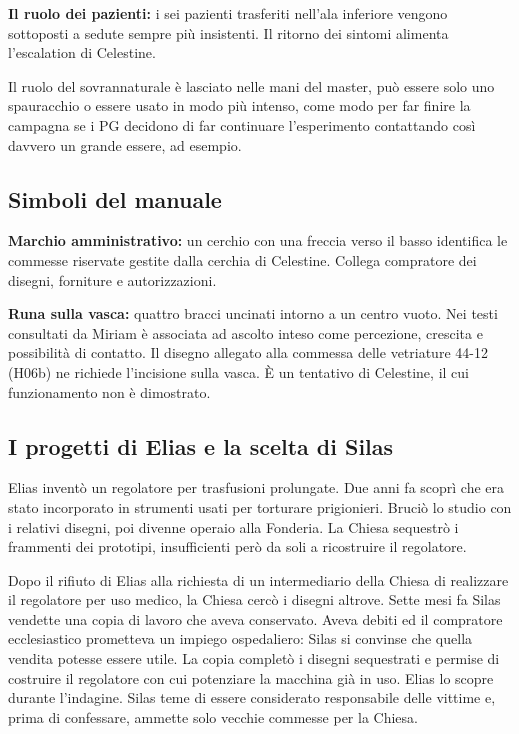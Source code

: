 \documentclass[11pt,a4paper]{article}
\begin{document}
\textbf{Il ruolo dei pazienti:} i sei pazienti  trasferiti nell'ala inferiore vengono sottoposti a sedute sempre più insistenti. Il ritorno dei sintomi alimenta l'escalation di Celestine.

\begin{gmbox}
Il ruolo del sovrannaturale è lasciato nelle mani del master, può essere solo uno spauracchio o essere usato in modo più intenso, come modo per far finire la campagna se i PG decidono di far continuare l'esperimento contattando così davvero un grande essere, ad esempio. 
\end{gmbox}

\subsection{Simboli del manuale}
\textbf{Marchio amministrativo:} un cerchio con una freccia verso il basso identifica le commesse riservate gestite dalla cerchia di Celestine. Collega compratore dei disegni, forniture e autorizzazioni.

\textbf{Runa sulla vasca:} quattro bracci uncinati intorno a un centro vuoto. Nei testi consultati da Miriam è associata ad ascolto inteso come percezione, crescita e possibilità di contatto. Il disegno allegato alla commessa delle vetriature 44-12 (H06b) ne richiede l'incisione sulla vasca. È un tentativo di Celestine, il cui funzionamento non è dimostrato.


\subsection{I progetti di Elias e la scelta di Silas}
Elias inventò un regolatore per trasfusioni prolungate. Due anni fa scoprì che era stato incorporato in strumenti usati per torturare prigionieri. Bruciò lo studio con i relativi disegni, poi divenne operaio alla Fonderia. La Chiesa sequestrò i frammenti dei prototipi, insufficienti però da soli a ricostruire il regolatore.

Dopo il rifiuto di Elias alla richiesta di un intermediario della Chiesa di realizzare il regolatore per uso medico, la Chiesa cercò i disegni altrove. Sette mesi fa Silas vendette una copia di lavoro che aveva conservato. Aveva debiti ed il compratore ecclesiastico prometteva un impiego ospedaliero: Silas si convinse che quella vendita potesse essere utile. La copia completò i disegni sequestrati e permise di costruire il regolatore con cui potenziare la macchina già in uso. Elias lo scopre durante l'indagine. Silas teme di essere considerato responsabile delle vittime e, prima di confessare, ammette solo vecchie commesse per la Chiesa.
\end{document}

